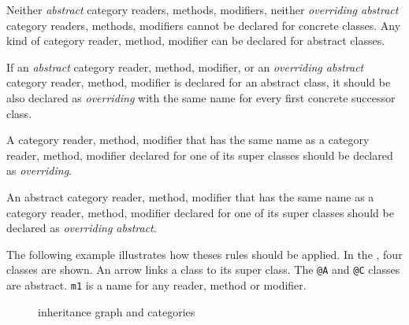 Neither \emph{abstract} category readers, methods, modifiers, neither \emph{overriding abstract} category readers, methods, modifiers cannot be declared for concrete classes. Any kind of category reader, method, modifier can be declared for abstract classes.

If an \emph{abstract} category reader, method, modifier, or an \emph{overriding abstract} category reader, method, modifier is declared for an abstract class, it should be also declared as \emph{overriding} with the same name for every first concrete successor class.

A category reader, method, modifier that has the same name as a category reader, method, modifier declared for one of its super classes should be declared as \emph{overriding}.

An abstract category reader, method, modifier that has the same name as a category reader, method, modifier declared for one of its super classes should be declared as \emph{overriding abstract}.

The following example illustrates how theses rules should be applied. In the , four classes are shown. An arrow links a class to its super class. The \lstinline[language=galgas]!@A! and \lstinline[language=galgas]!@C! classes are abstract. \lstinline[language=galgas]!m1! is a name for any reader, method or modifier.

\begin{figure}[ht]
  \centering
  \caption{inheritance graph and categories}
\end{figure}

